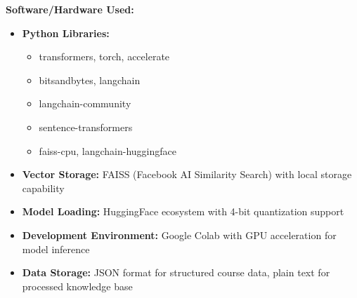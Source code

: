 \documentclass[conference]{IEEEtran}
\begin{document}
\textbf{Software/Hardware Used:}
\begin{itemize}
    \item \textbf{Python Libraries:}
        \begin{itemize}
            \item transformers, torch, accelerate
            \item bitsandbytes, langchain
            \item langchain-community
            \item sentence-transformers
            \item faiss-cpu, langchain-huggingface
        \end{itemize}
    \item \textbf{Vector Storage:} FAISS (Facebook AI Similarity Search) with local storage capability
    \item \textbf{Model Loading:} HuggingFace ecosystem with 4-bit quantization support
    \item \textbf{Development Environment:} Google Colab with GPU acceleration for model inference
    \item \textbf{Data Storage:} JSON format for structured course data, plain text for processed knowledge base
\end{itemize}
\end{document}
